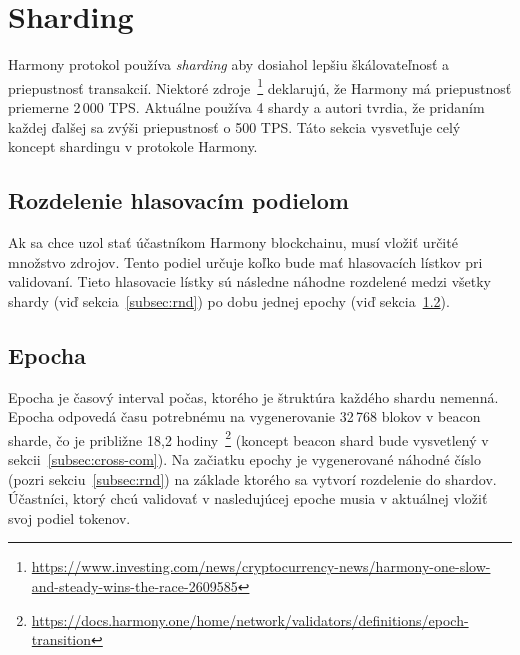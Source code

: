 \section{Sharding}\label{sec:harmony-shards}

Harmony protokol používa \textit{sharding} aby dosiahol lepšiu škálovateľnosť a priepustnosť transakcií. Niektoré zdroje~\footnote{\url{https://www.investing.com/news/cryptocurrency-news/harmony-one-slow-and-steady-wins-the-race-2609585}} deklarujú, že Harmony má priepustnosť priemerne 2\,000 TPS. Aktuálne používa 4 shardy a autori tvrdia, že pridaním každej ďalšej sa zvýši priepustnosť o 500 TPS. Táto sekcia vysvetľuje celý koncept shardingu v protokole Harmony.

\subsection{Rozdelenie hlasovacím podielom}\label{subsec:rand-dist}
Ak sa chce uzol stať účastníkom Harmony blockchainu, musí vložiť určité množstvo zdrojov. Tento podiel určuje koľko bude mať hlasovacích lístkov pri validovaní. Tieto hlasovacie lístky sú následne náhodne rozdelené medzi všetky shardy (viď sekcia~\ref{subsec:rnd}) po dobu jednej epochy (viď sekcia~\ref{subsec:epoch}).

\subsection{Epocha}\label{subsec:epoch}
Epocha je časový interval počas, ktorého je štruktúra každého shardu nemenná. Epocha odpovedá času potrebnému na vygenerovanie 32\,768 blokov v beacon sharde, čo je približne 18,2 hodiny~\footnote{\url{https://docs.harmony.one/home/network/validators/definitions/epoch-transition}} (koncept beacon shard bude vysvetlený v sekcii~\ref{subsec:cross-com}). Na začiatku epochy je vygenerované náhodné číslo (pozri sekciu~\ref{subsec:rnd}) na základe ktorého sa vytvorí rozdelenie do shardov. Účastníci, ktorý chcú validovať v nasledujúcej epoche musia v aktuálnej vložiť svoj podiel tokenov.

